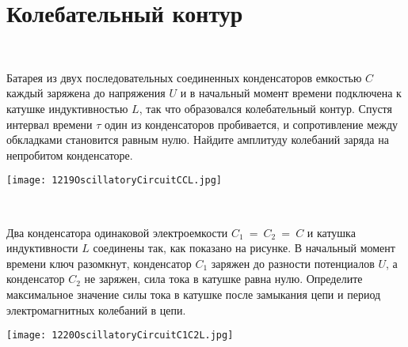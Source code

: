 \section{Колебательный контур}

\begin{ex}
\hspace{0pt} \\
\begin{minipage}{.65\textwidth}
Батарея из двух последовательных соединенных конденсаторов емкостью $C$ каждый заряжена до напряжения $U$ и в начальный момент времени подключена к катушке индуктивностью $L$, так что образовался колебательный контур. 
Спустя интервал времени $\tau$ один из конденсаторов пробивается, и сопротивление между обкладками становится равным нулю. 
Найдите амплитуду колебаний заряда на непробитом конденсаторе.
\end{minipage}
\begin{minipage}{.35\textwidth}
\centering
\texttt{[image: 1219OscillatoryCircuitCCL.jpg]}
\end{minipage}
\begin{ans}
\end{ans}
\end{ex}

\begin{ex}
\hspace{0pt} \\
\begin{minipage}{.65\textwidth}
 Два конденсатора одинаковой электроемкости $C_1~=~C_2~=~C$ и катушка индуктивности $L$ соединены так, как показано на рисунке. 
В начальный момент времени ключ разомкнут, конденсатор $C_1$ заряжен до разности потенциалов $U$, а конденсатор $C_2$ не заряжен, 
сила тока в катушке равна нулю. Определите максимальное значение силы тока в катушке после замыкания цепи и период электромагнитных колебаний в цепи. 
\end{minipage}
\begin{minipage}{.35\textwidth}
\centering
\texttt{[image: 1220OscillatoryCircuitC1C2L.jpg]}
\end{minipage}
\begin{ans}
\end{ans}
\end{ex}

